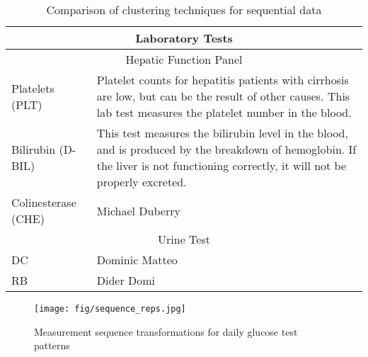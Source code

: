 \begin{table}
\begin{center}
    \caption{Comparison of clustering techniques for sequential data}
\label{hepaticpanel}
\begin{tabular}{| p{2cm} | p{10cm}  |}
  \hline
  \multicolumn{2}{|c|}{\textbf{Laboratory Tests} } \\
  \hline
  \multicolumn{2}{|c|}{Hepatic Function Panel}\\ \hline
  Platelets (PLT) & Platelet counts for hepatitis patients with cirrhosis are low, but can be the result of other causes.  This lab test measures the platelet number in the blood. \\ \hline
  Bilirubin (D-BIL) & This test measures the bilirubin level in the blood, and is produced by the breakdown of hemoglobin. If the liver is not functioning correctly, it will not be properly excreted.\\ \hline
  Colinesterase (CHE) & Michael Duberry \\ \hline
  \multicolumn{2}{|c|}{Urine Test}\\ \hline
  DC & Dominic Matteo \\ \hline
  RB & Dider Domi \\
  \hline
\end{tabular}
\end{center}
\end{table}


\begin{landscape}
\begin{figure}
\begin{center}
\centerline{\texttt{[image: fig/sequence\_reps.jpg]}}
\caption{Measurement sequence transformations for daily glucose test patterns}
\label{sequence_reps}
\end{center}
\vskip -0.2in
\end{figure}
\end{landscape}



